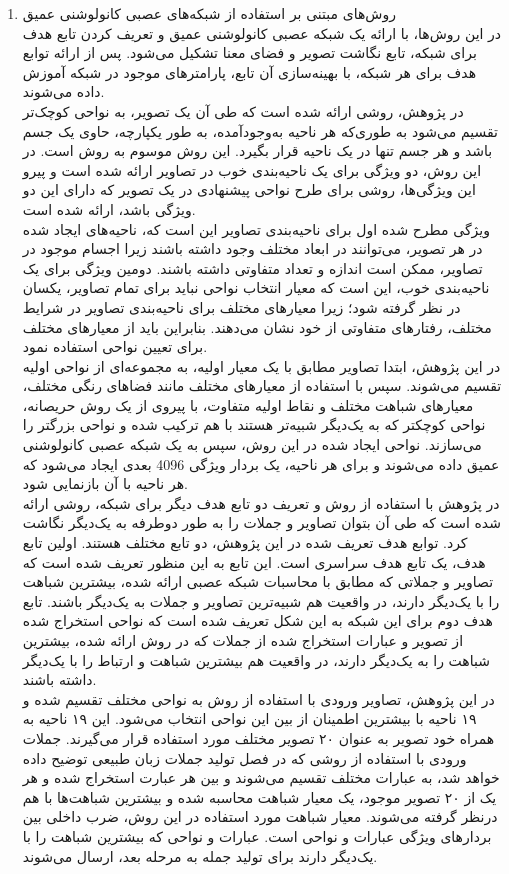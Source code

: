 \begin{enumerate}
\item
روش‌های مبتنی بر استفاده از شبکه‌های عصبی کانولوشنی عمیق\\
در این روش‌ها، با ارائه یک شبکه عصبی کانولوشنی عمیق و تعریف کردن تابع هدف برای شبکه، تابع نگاشت تصویر و فضای معنا تشکیل می‌شود. پس از ارائه توابع هدف برای هر شبکه، با بهینه‌سازی آن تابع، پارامترهای موجود در شبکه آموزش داده می‌شوند.
\\
در پژوهش\cite{Girshick_2014_CVPR}، روشی ارائه شده است که طی آن یک تصویر، به نواحی کوچک‌تر تقسیم می‌شود به طوری‌که هر ناحیه به‌وجودآمده، به طور یکپارچه، حاوی یک جسم باشد و هر جسم تنها در یک ناحیه قرار بگیرد. این روش موسوم به روش  است. در این روش، دو ویژگی برای یک ناحیه‌بندی خوب در تصاویر ارائه شده است و پیرو این ویژگی‌ها، روشی برای طرح نواحی پیشنهادی در یک تصویر که دارای این دو ویژگی باشد، ارائه شده است.
\\
ویژگی مطرح شده اول برای ناحیه‌بندی تصاویر این است که، ناحیه‌های ایجاد شده در هر تصویر، می‌توانند در ابعاد مختلف وجود داشته باشند زیرا اجسام موجود در تصاویر، ممکن است اندازه و تعداد متفاوتی داشته باشند. دومین ویژگی برای یک ناحیه‌بندی خوب، این است که معیار انتخاب نواحی نباید برای تمام تصاویر، یکسان در نظر گرفته شود؛ زیرا معیارهای مختلف برای ناحیه‌بندی تصاویر در شرایط مختلف، رفتارهای متفاوتی از خود نشان می‌دهند. بنابراین باید از معیارهای مختلف برای تعیین نواحی استفاده نمود.
\\
در این پژوهش، ابتدا تصاویر مطابق با یک معیار اولیه، به مجموعه‌ای از نواحی اولیه تقسیم می‌شوند. سپس با استفاده از معیارهای مختلف مانند فضاهای رنگی مختلف،‌ معیارهای شباهت مختلف و نقاط اولیه متفاوت، با پیروی از یک روش حریصانه، نواحی کوچکتر که به یک‌دیگر شبیه‌تر هستند با هم ترکیب شده و نواحی بزرگتر را می‌سازند. نواحی ایجاد شده در این روش، سپس به یک شبکه عصبی کانولوشنی عمیق داده می‌شوند و برای هر ناحیه، یک بردار ویژگی 4096 بعدی ایجاد می‌شود که هر ناحیه با آن بازنمایی شود.
\\
در پژوهش \cite{karpathy2014deep} با استفاده از روش  و تعریف دو تابع هدف دیگر برای شبکه، روشی ارائه شده است که طی آن بتوان تصاویر و جملات را به طور دوطرفه به یک‌دیگر نگاشت کرد. توابع هدف تعریف شده در این پژوهش، دو تابع مختلف هستند. اولین تابع هدف، یک تابع هدف سراسری است. این تابع به این منظور تعریف شده است که تصاویر و جملاتی که مطابق با محاسبات شبکه عصبی ارائه شده، بیشترین شباهت را با یک‌دیگر دارند، در واقعیت هم شبیه‌ترین تصاویر و جملات به یک‌دیگر باشند. تابع هدف دوم برای این شبکه به این شکل تعریف شده است که نواحی استخراج شده از تصویر و عبارات استخراج شده از جملات که در روش ارائه شده، بیشترین شباهت را به یک‌دیگر دارند،‌ در واقعیت هم بیشترین شباهت و ارتباط را با یک‌دیگر داشته باشند.
\\
در این پژوهش، تصاویر ورودی با استفاده از روش  به نواحی مختلف تقسیم شده و ۱۹ ناحیه با بیشترین اطمینان از بین این نواحی انتخاب می‌شود. این ۱۹ ناحیه به همراه خود تصویر به عنوان ۲۰ تصویر مختلف مورد استفاده قرار می‌گیرند. جملات ورودی با استفاده از روشی که در فصل تولید جملات زبان طبیعی توضیح داده خواهد شد، به عبارات مختلف تقسیم می‌شوند و بین هر عبارت استخراج شده و هر یک از ۲۰ تصویر موجود، یک معیار شباهت محاسبه شده و بیشترین شباهت‌ها با هم درنظر گرفته می‌شوند. معیار شباهت مورد استفاده در این روش، ضرب داخلی بین بردارهای ویژگی عبارات و نواحی است. عبارات و نواحی که بیشترین شباهت را با یک‌دیگر دارند برای تولید جمله به مرحله بعد، ارسال می‌شوند.
\end{enumerate}